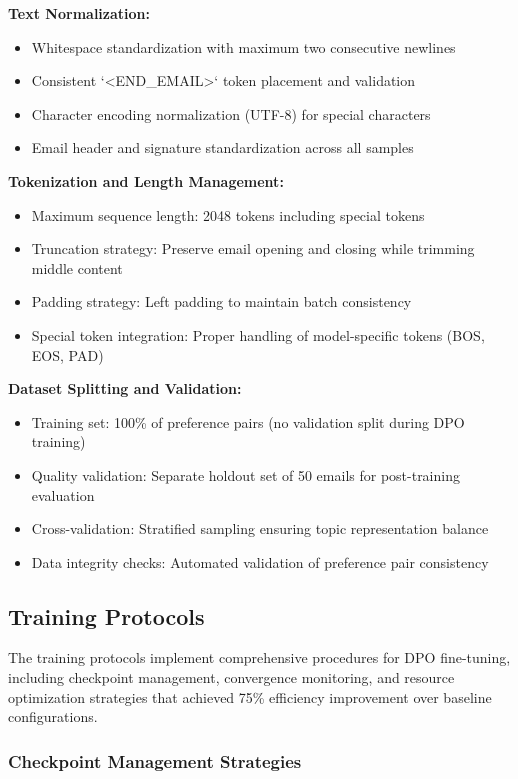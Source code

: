 \textbf{Text Normalization:}
\begin{itemize}
    \item Whitespace standardization with maximum two consecutive newlines
    \item Consistent `<END\_EMAIL>` token placement and validation
    \item Character encoding normalization (UTF-8) for special characters
    \item Email header and signature standardization across all samples
\end{itemize}

\textbf{Tokenization and Length Management:}
\begin{itemize}
    \item Maximum sequence length: 2048 tokens including special tokens
    \item Truncation strategy: Preserve email opening and closing while trimming middle content
    \item Padding strategy: Left padding to maintain batch consistency
    \item Special token integration: Proper handling of model-specific tokens (BOS, EOS, PAD)
\end{itemize}

\textbf{Dataset Splitting and Validation:}
\begin{itemize}
    \item Training set: 100\% of preference pairs (no validation split during DPO training)
    \item Quality validation: Separate holdout set of 50 emails for post-training evaluation
    \item Cross-validation: Stratified sampling ensuring topic representation balance
    \item Data integrity checks: Automated validation of preference pair consistency
\end{itemize}

\subsection{Training Protocols}
\label{subsec:dpo-training-protocols}

The training protocols implement comprehensive procedures for DPO fine-tuning, including checkpoint management, convergence monitoring, and resource optimization strategies that achieved 75\% efficiency improvement over baseline configurations.

\subsubsection{Checkpoint Management Strategies}

